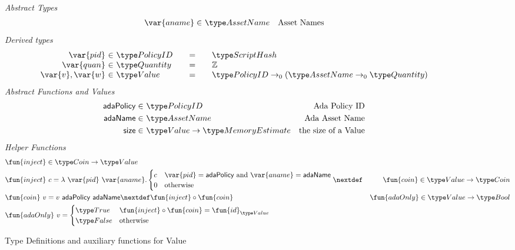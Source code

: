 \begin{figure*}[t!]
  \emph{Abstract Types}
  \begin{align*}
    \var{aname} \in& ~\AssetName & \text{Asset Names}
  \end{align*}
  \emph{Derived types}
  \begin{equation*}
    \begin{array}{r@{~\in~}l@{\qquad=\qquad}lr}
      \var{pid} & \PolicyID & \ScriptHash \\
      \var{quan} & \Quantity & \Z \\
      \var{v}, \var{w} & \Value
      & \PolicyID \to_0 ( \AssetName \to_0 \Quantity )
    \end{array}
  \end{equation*}
  \emph{Abstract Functions and Values}
  \begin{align*}
    \mathsf{adaPolicy} \in& ~\PolicyID & \text{Ada Policy ID} \\
    \mathsf{adaName} \in& ~\AssetName & \text{Ada Asset Name} \\
    \mathsf{size} \in& ~\Value\to\MemoryEstimate & \text{the size of a Value}
  \end{align*}
  \emph{Helper Functions}
  \begin{align*}
    & \fun{inject} \in \Coin\to \Value \\
    & \fun{inject}~c = \lambda~\var{pid}~\var{aname}.
      \begin{cases}
        c & \var{pid} = \mathsf{adaPolicy}~\text{and}~\var{aname} = \mathsf{adaName} \\
        0 & \text{otherwise}
      \end{cases}
    \nextdef
    & \fun{coin} \in \Value \to \Coin \\
    & \fun{coin}~v = v~\mathsf{adaPolicy}~\mathsf{adaName}
    \nextdef \fun{inject} \circ \fun{coin}
    & \fun{adaOnly} \in \Value \to \Bool \\
    & \fun{adaOnly}~v =
      \begin{cases}
        \True & \fun{inject} \circ \fun{coin} = \fun{id}_{\Value} \\
        \False & \text{otherwise}
      \end{cases}
  \end{align*}
  \caption{Type Definitions and auxiliary functions for Value}
  \label{fig:defs:value}
\end{figure*}

